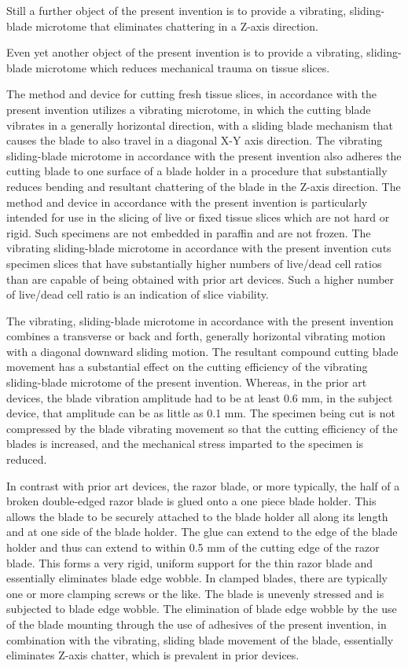 \documentclass{article}
\begin{document}
Still a further object of the present invention is to provide a vibrating, sliding-blade microtome that eliminates chattering in a Z-axis direction.

Even yet another object of the present invention is to provide a vibrating, sliding-blade microtome which reduces mechanical trauma on tissue slices.

The method and device for cutting fresh tissue slices, in accordance with the present invention utilizes a vibrating microtome, in which the cutting blade vibrates in a generally horizontal direction, with a sliding blade mechanism that causes the blade to also travel in a diagonal X-Y axis direction. The vibrating sliding-blade microtome in accordance with the present invention also adheres the cutting blade to one surface of a blade holder in a procedure that substantially reduces bending and resultant chattering of the blade in the Z-axis direction. The method and device in accordance with the present invention is particularly intended for use in the slicing of live or fixed tissue slices which are not hard or rigid. Such specimens are not embedded in paraffin and are not frozen. The vibrating sliding-blade microtome in accordance with the present invention cuts specimen slices that have substantially higher numbers of live/dead cell ratios than are capable of being obtained with prior art devices. Such a higher number of live/dead cell ratio is an indication of slice viability.

The vibrating, sliding-blade microtome in accordance with the present invention combines a transverse or back and forth, generally horizontal vibrating motion with a diagonal downward sliding motion. The resultant compound cutting blade movement has a substantial effect on the cutting efficiency of the vibrating sliding-blade microtome of the present invention. Whereas, in the prior art devices, the blade vibration amplitude had to be at least 0.6 mm, in the subject device, that amplitude can be as little as 0.1 mm. The specimen being cut is not compressed by the blade vibrating movement so that the cutting efficiency of the blades is increased, and the mechanical stress imparted to the specimen is reduced.

In contrast with prior art devices, the razor blade, or more typically, the half of a broken double-edged razor blade is glued onto a one piece blade holder. This allows the blade to be securely attached to the blade holder all along its length and at one side of the blade holder. The glue can extend to the edge of the blade holder and thus can extend to within 0.5 mm of the cutting edge of the razor blade. This forms a very rigid, uniform support for the thin razor blade and essentially eliminates blade edge wobble. In clamped blades, there are typically one or more clamping screws or the like. The blade is unevenly stressed and is subjected to blade edge wobble. The elimination of blade edge wobble by the use of the blade mounting through the use of adhesives of the present invention, in combination with the vibrating, sliding blade movement of the blade, essentially eliminates Z-axis chatter, which is prevalent in prior devices.
\end{document}
